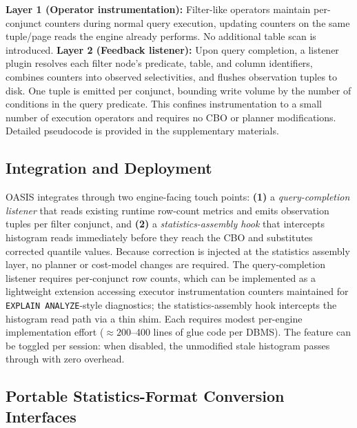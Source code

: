 \documentclass[runningheads]{llncs}
\begin{document}
\textbf{Layer 1 (Operator instrumentation):} Filter-like operators maintain per-conjunct counters during normal query execution, updating counters on the same tuple/page reads the engine already performs. No additional table scan is introduced. \textbf{Layer 2 (Feedback listener):} Upon query completion, a listener plugin resolves each filter node's predicate, table, and column identifiers, combines counters into observed selectivities, and flushes observation tuples to disk. One tuple is emitted per conjunct, bounding write volume by the number of conditions in the query predicate. This confines instrumentation to a small number of execution operators and requires no CBO or planner modifications. Detailed pseudocode is provided in the supplementary materials.

\subsection{Integration and Deployment}
\label{sec:integration}

OASIS integrates through two engine-facing touch points:
\textbf{(1)} a \emph{query-completion listener} that reads existing runtime row-count metrics and emits observation tuples per filter conjunct, and \textbf{(2)} a \emph{statistics-assembly hook} that intercepts histogram reads immediately before they reach the CBO and substitutes corrected quantile values.
Because correction is injected at the statistics assembly layer, no planner or cost-model changes are required.
The query-completion listener requires per-conjunct row counts, which can be implemented as a lightweight extension accessing executor instrumentation counters maintained for \texttt{EXPLAIN ANALYZE}-style diagnostics; the statistics-assembly hook intercepts the histogram read path via a thin shim. Each requires modest per-engine implementation effort (${\approx}200$--400 lines of glue code per DBMS). The feature can be toggled per session: when disabled, the unmodified stale histogram passes through with zero overhead.

\subsection{Portable Statistics-Format Conversion Interfaces}
\label{sec:mcv-adapter}
\end{document}

